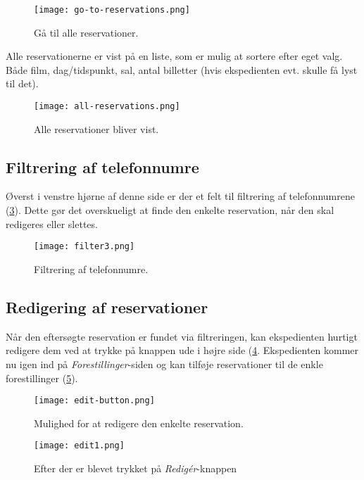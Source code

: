 \begin{figure} [h]
  \centering
  \texttt{[image: go-to-reservations.png]}
  \caption{Gå til alle reservationer.}
  \label{screenshot: go-to-reservations}
\end{figure}

Alle reservationerne er vist på en liste, som er mulig at sortere efter eget valg. Både film, dag/tidspunkt, sal, antal billetter (hvis ekspedienten evt. skulle få lyst til det). 

\begin{figure} [h]
  \centering
  \texttt{[image: all-reservations.png]}
  \caption{Alle reservationer bliver vist.}
  \label{screenshot: all-reservations}
\end{figure}

\subsection{Filtrering af telefonnumre}

Øverst i venstre hjørne af denne side er der et felt til filtrering af telefonnumrene (\ref{screenshot: filter3}). Dette gør det overskueligt at finde den enkelte reservation, når den skal redigeres eller slettes. 

\begin{figure} [h]
  \centering
  \texttt{[image: filter3.png]}
  \caption{Filtrering af telefonnumre.}
  \label{screenshot: filter3}
\end{figure}

\subsection{Redigering af reservationer}

Når den eftersøgte reservation er fundet via filtreringen, kan ekspedienten hurtigt redigere dem ved at trykke på knappen ude i højre side (\ref{screenshot: edit-button}. Ekspedienten kommer nu igen ind på \textit{Forestillinger}-siden og kan tilføje reservationer til de enkle forestillinger (\ref{screenshot: edit1}).

\begin{figure} [h]
  \centering
  \texttt{[image: edit-button.png]}
  \caption{Mulighed for at redigere den enkelte reservation.}
  \label{screenshot: edit-button}
\end{figure}

\begin{figure} [h]
  \centering
  \texttt{[image: edit1.png]}
  \caption{Efter der er blevet trykket på \textit{Redigér}-knappen}
  \label{screenshot: edit1}
\end{figure}


